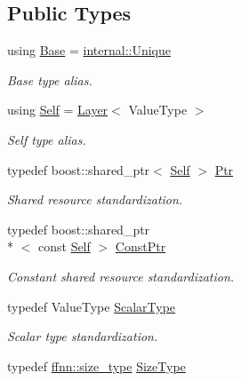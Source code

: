\subsection*{Public Types}
\begin{DoxyCompactItemize}
\item 
using \hyperlink{classffnn_1_1layer_1_1_layer_a6c68e887931a3450aaba7a32cfe1f130}{Base} = \hyperlink{classffnn_1_1internal_1_1_unique}{internal\-::\-Unique}
\begin{DoxyCompactList}\small\item\em Base type alias. \end{DoxyCompactList}\item 
using \hyperlink{classffnn_1_1layer_1_1_layer_a1d461b24632a849b2c26a5051a9cdbeb}{Self} = \hyperlink{classffnn_1_1layer_1_1_layer}{Layer}$<$ Value\-Type $>$
\begin{DoxyCompactList}\small\item\em Self type alias. \end{DoxyCompactList}\item 
typedef boost\-::shared\-\_\-ptr$<$ \hyperlink{classffnn_1_1layer_1_1_layer_a1d461b24632a849b2c26a5051a9cdbeb}{Self} $>$ \hyperlink{classffnn_1_1layer_1_1_layer_ac336e7cc01ccf0117c5a4a2baf98add4}{Ptr}
\begin{DoxyCompactList}\small\item\em Shared resource standardization. \end{DoxyCompactList}\item 
typedef boost\-::shared\-\_\-ptr\\*
$<$ const \hyperlink{classffnn_1_1layer_1_1_layer_a1d461b24632a849b2c26a5051a9cdbeb}{Self} $>$ \hyperlink{classffnn_1_1layer_1_1_layer_ad7c9ea196243e78b9c1e4a3a1a17988b}{Const\-Ptr}
\begin{DoxyCompactList}\small\item\em Constant shared resource standardization. \end{DoxyCompactList}\item 
typedef Value\-Type \hyperlink{classffnn_1_1layer_1_1_layer_a3d482813f86f1ec69554b4592c478c32}{Scalar\-Type}
\begin{DoxyCompactList}\small\item\em Scalar type standardization. \end{DoxyCompactList}\item 
typedef \hyperlink{namespaceffnn_a63b90a2fd70eb76684eac482a51633e5}{ffnn\-::size\-\_\-type} \hyperlink{classffnn_1_1layer_1_1_layer_a4c4c9782d2aed41c2a5000ec5da5601a}{Size\-Type}

\end{DoxyCompactItemize}

